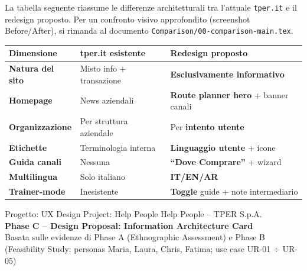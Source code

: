 \begin{tcolorbox}[colback=backgroundColor,colframe=primaryColor,arc=2mm]
{\small
La tabella seguente riassume le differenze architetturali tra l'attuale \texttt{tper.it} e il redesign proposto. Per un confronto visivo approfondito (screenshot Before/After), si rimanda al documento \texttt{Comparison/00-comparison-main.tex}.

\vspace{0.3cm}
\renewcommand{\arraystretch}{1.2}
\begin{tabular}{|p{3cm}|p{5cm}|p{5cm}|}
\hline
\textbf{Dimensione} & \textbf{tper.it esistente} & \textbf{Redesign proposto} \\
\hline
\textbf{Natura del sito} & Misto info + transazione & \textbf{Esclusivamente informativo} \\
\hline
\textbf{Homepage} & News aziendali & \textbf{Route planner hero} + banner canali \\
\hline
\textbf{Organizzazione} & Per struttura aziendale & Per \textbf{intento utente} \\
\hline
\textbf{Etichette} & Terminologia interna & \textbf{Linguaggio utente} + icone \\
\hline
\textbf{Guida canali} & Nessuna & \textbf{``Dove Comprare''} + wizard \\
\hline
\textbf{Multilingua} & Solo italiano & \textbf{IT/EN/AR} \\
\hline
\textbf{Trainer-mode} & Inesistente & \textbf{Toggle} guide + note intermediario \\
\hline
\end{tabular}
}
\end{tcolorbox}

\vspace{0.5cm}

\begin{center}
{\color{secondaryColor}\small Progetto: UX Design Project: Help People Help People -- TPER S.p.A. \\[4pt]
\textbf{Phase C -- Design Proposal: Information Architecture Card} \\[4pt]
Basata sulle evidenze di Phase A (Ethnographic Assessment) e Phase B (Feasibility Study: personas Maria, Laura, Chris, Fatima; use case UR-01 ÷ UR-05)}
\end{center}


